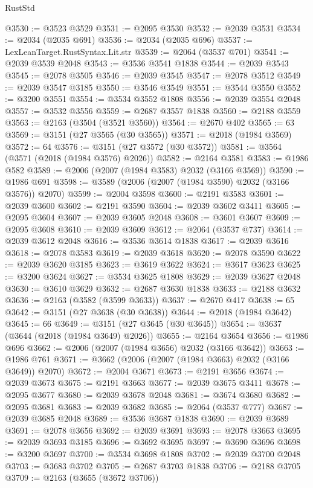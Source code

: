 \begin{lexlean}{RustStd}
\begin{coremodule}
@3530 := @3523 @3529
@3531 := @2095 @3530
@3532 := @2039 @3531
@3534 := @2034 (@2035 @691)
@3536 := @2034 (@2035 @696)
@3537 := LexLeanTarget.RustSyntax.Lit.str
@3539 := @2064 (@3537 @701)
@3541 := @2039 @3539 @2048
@3543 := @3536 @3541 @1838
@3544 := @2039 @3543
@3545 := @2078 @3505
@3546 := @2039 @3545
@3547 := @2078 @3512
@3549 := @2039 @3547 @3185
@3550 := @3546 @3549
@3551 := @3544 @3550
@3552 := @3200 @3551
@3554 := @3534 @3552 @1808
@3556 := @2039 @3554 @2048
@3557 := @3532 @3556
@3559 := @2687 @3557 @1838
@3560 := @2188 @3559
@3563 := @2163 (@3504 (@3521 @3560))
@3564 := @2670 @402
@3565 := 63
@3569 := @3151 (@27 @3565 (@30 @3565))
@3571 := @2018 (@1984 @3569)
@3572 := 64
@3576 := @3151 (@27 @3572 (@30 @3572))
@3581 := @3564 (@3571 (@2018 (@1984 @3576) @2026))
@3582 := @2164 @3581
@3583 := @1986 @582
@3589 := @2006 (@2007 (@1984 @3583) @2032 (@3166 @3569))
@3590 := @1986 @691
@3598 := @3589 (@2006 (@2007 (@1984 @3590) @2032 (@3166 @3576)) @2070)
@3599 := @2004 @3598
@3600 := @2191 @3583
@3601 := @2039 @3600
@3602 := @2191 @3590
@3604 := @2039 @3602 @3411
@3605 := @2095 @3604
@3607 := @2039 @3605 @2048
@3608 := @3601 @3607
@3609 := @2095 @3608
@3610 := @2039 @3609
@3612 := @2064 (@3537 @737)
@3614 := @2039 @3612 @2048
@3616 := @3536 @3614 @1838
@3617 := @2039 @3616
@3618 := @2078 @3583
@3619 := @2039 @3618
@3620 := @2078 @3590
@3622 := @2039 @3620 @3185
@3623 := @3619 @3622
@3624 := @3617 @3623
@3625 := @3200 @3624
@3627 := @3534 @3625 @1808
@3629 := @2039 @3627 @2048
@3630 := @3610 @3629
@3632 := @2687 @3630 @1838
@3633 := @2188 @3632
@3636 := @2163 (@3582 (@3599 @3633))
@3637 := @2670 @417
@3638 := 65
@3642 := @3151 (@27 @3638 (@30 @3638))
@3644 := @2018 (@1984 @3642)
@3645 := 66
@3649 := @3151 (@27 @3645 (@30 @3645))
@3654 := @3637 (@3644 (@2018 (@1984 @3649) @2026))
@3655 := @2164 @3654
@3656 := @1986 @696
@3662 := @2006 (@2007 (@1984 @3656) @2032 (@3166 @3642))
@3663 := @1986 @761
@3671 := @3662 (@2006 (@2007 (@1984 @3663) @2032 (@3166 @3649)) @2070)
@3672 := @2004 @3671
@3673 := @2191 @3656
@3674 := @2039 @3673
@3675 := @2191 @3663
@3677 := @2039 @3675 @3411
@3678 := @2095 @3677
@3680 := @2039 @3678 @2048
@3681 := @3674 @3680
@3682 := @2095 @3681
@3683 := @2039 @3682
@3685 := @2064 (@3537 @777)
@3687 := @2039 @3685 @2048
@3689 := @3536 @3687 @1838
@3690 := @2039 @3689
@3691 := @2078 @3656
@3692 := @2039 @3691
@3693 := @2078 @3663
@3695 := @2039 @3693 @3185
@3696 := @3692 @3695
@3697 := @3690 @3696
@3698 := @3200 @3697
@3700 := @3534 @3698 @1808
@3702 := @2039 @3700 @2048
@3703 := @3683 @3702
@3705 := @2687 @3703 @1838
@3706 := @2188 @3705
@3709 := @2163 (@3655 (@3672 @3706))

\end{coremodule}
\end{lexlean}
